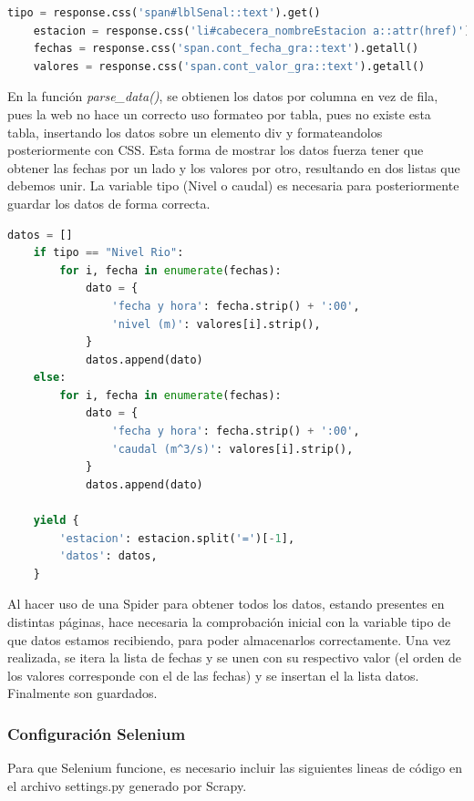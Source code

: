 \begin{lstlisting}[language=Python, caption={Selector en \textit{parse\_data()} de Agua en Navarra Data Spider}]
	tipo = response.css('span#lblSenal::text').get()
	estacion = response.css('li#cabecera_nombreEstacion a::attr(href)').get()
	fechas = response.css('span.cont_fecha_gra::text').getall()
	valores = response.css('span.cont_valor_gra::text').getall()
\end{lstlisting}

En la función \textit{parse\_data()}, se obtienen los datos por columna en vez de fila, pues la web no hace un correcto uso formateo por tabla, pues no existe esta tabla, insertando los datos sobre un elemento div y formateandolos posteriormente con CSS. Esta forma de mostrar los datos fuerza tener que obtener las fechas por un lado y los valores por otro, resultando en dos listas que debemos unir. La variable tipo (Nivel o caudal) es necesaria para posteriormente guardar los datos de forma correcta.

\begin{lstlisting}[language=Python, caption={Selector en \textit{parse\_data()} de Agua en Navarra Data Spider}]
	datos = []
	if tipo == "Nivel Rio":
		for i, fecha in enumerate(fechas):
			dato = {
				'fecha y hora': fecha.strip() + ':00',
				'nivel (m)': valores[i].strip(),
			}
			datos.append(dato)
	else:
		for i, fecha in enumerate(fechas):
			dato = {
				'fecha y hora': fecha.strip() + ':00',
				'caudal (m^3/s)': valores[i].strip(),
			}
			datos.append(dato)
	
	yield {
		'estacion': estacion.split('=')[-1],
		'datos': datos,
	}
\end{lstlisting}

Al hacer uso de una Spider para obtener todos los datos, estando presentes en distintas páginas, hace necesaria la comprobación inicial con la variable tipo de que datos estamos recibiendo, para poder almacenarlos correctamente. Una vez realizada, se itera la lista de fechas y se unen con su respectivo valor (el orden de los valores corresponde con el de las fechas) y se insertan el la lista datos. Finalmente son guardados.

\subsubsection{Configuración Selenium}
Para que Selenium funcione, es necesario incluir las siguientes lineas de código en el archivo settings.py generado por Scrapy.

